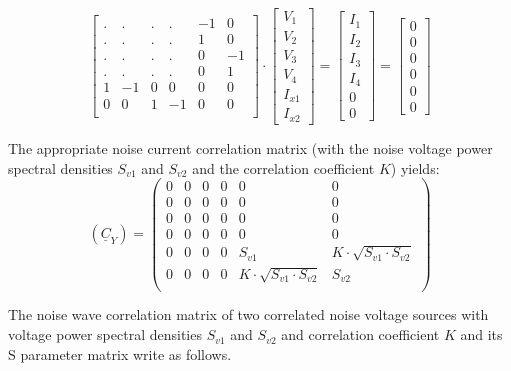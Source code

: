\begin{equation}
\begin{bmatrix}
.&.&.&.& -1 &  0 \\
.&.&.&.&  1 &  0 \\
.&.&.&.&  0 & -1 \\
.&.&.&.&  0 &  1 \\
1 & -1 & 0 &  0 & 0 & 0 \\
0 &  0 & 1 & -1 & 0 & 0 \\
\end{bmatrix}
\cdot
\begin{bmatrix}
V_{1}\\
V_{2}\\
V_{3}\\
V_{4}\\
I_{x1}\\
I_{x2}
\end{bmatrix}
=
\begin{bmatrix}
I_{1}\\
I_{2}\\
I_{3}\\
I_{4}\\
0\\
0
\end{bmatrix}
=
\begin{bmatrix}
0\\
0\\
0\\
0\\
0\\
0
\end{bmatrix}
\end{equation}

The appropriate noise current correlation matrix (with the noise
voltage power spectral densities $S_{v1}$ and $S_{v2}$ and the
correlation coefficient $K$) yields:
\begin{equation}
(\underline{C}_Y) =
\begin{pmatrix}
 0 & 0 & 0 & 0 & 0 & 0\\
 0 & 0 & 0 & 0 & 0 & 0\\
 0 & 0 & 0 & 0 & 0 & 0\\
 0 & 0 & 0 & 0 & 0 & 0\\
 0 & 0 & 0 & 0 & S_{v1} & K\cdot\sqrt{S_{v1}\cdot S_{v2}}\\
 0 & 0 & 0 & 0 & K\cdot\sqrt{S_{v1}\cdot S_{v2}} & S_{v2}\\
\end{pmatrix}
\end{equation}

The noise wave correlation matrix of two correlated noise voltage
sources with voltage power spectral densities $S_{v1}$ and $S_{v2}$
and correlation coefficient $K$ and its S parameter matrix write as
follows.

